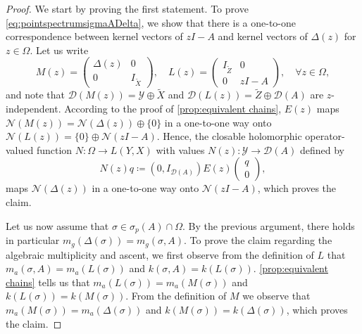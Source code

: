 \documentclass[english]{myarticle}
\begin{document}
\begin{sloppypar}
\begin{proof}
We start by proving the first statement. To prove \eqref{eq:pointspectrumsigmaADelta}, we show that there is a one-to-one correspondence between kernel vectors of $z I-A$ and kernel vectors of $\Delta(z)$ for $ z \in \Omega$. Let us write
\begin{equation*}
    M(z) = \begin{pmatrix}
            \Delta(z) & 0 \\
            0 & I_{\tilde{X}}
        \end{pmatrix}, \quad
    L(z) = \begin{pmatrix}
            I_{\tilde{Z}}& 0 \\
            0 & zI - A
        \end{pmatrix}, \quad \forall z \in \Omega,
\end{equation*}
and note that $\mathcal{D}(M(z)) = \mathcal{Y} \oplus \tilde{X}$ and $\mathcal{D}(L(z)) = \tilde{Z} \oplus \mathcal{D}(A)$ are $z$-independent. According to the proof of \cref{prop:equivalent chains}, $E(z)$ maps $\mathcal{N}(M(z)) = \mathcal{N}(\Delta(z)) \oplus \{0\}$ in a one-to-one way onto $\mathcal{N}(L(z)) = \{0\} \oplus \mathcal{N}(z I-A)$. Hence, the closable holomorphic operator-valued function $N : \Omega \to L(Y,X)$ with values $N(z) : \mathcal{Y} \to \mathcal{D}(A)$ defined by
\begin{equation*}
    N(z) q \coloneqq (0,I_{\mathcal{D}(A)}) E(z) 
    \begin{pmatrix}
        q \\
        0
    \end{pmatrix},
\end{equation*}
maps $\mathcal{N} (\Delta(z))$ in a one-to-one way onto $\mathcal{N}(z I-A)$, which proves the claim. 

Let us now assume that $\sigma \in \sigma_p(A) \cap \Omega$. By the previous argument, there holds in particular $m_g(\Delta(\sigma)) = m_g(\sigma,A)$. To prove the claim regarding the algebraic multiplicity and ascent, we first observe from the definition of $L$ that $m_a(\sigma,A) = m_a(L(\sigma))$ and $k(\sigma,A) = k(L(\sigma))$. \cref{prop:equivalent chains} tells us that $m_a(L(\sigma)) = m_a(M(\sigma))$ and $k(L(\sigma)) = k(M(\sigma))$. From the definition of $M$ we observe that $m_a(M(\sigma)) = m_a(\Delta(\sigma))$ and $k(M(\sigma)) = k(\Delta(\sigma))$, which proves the claim.


\end{proof}
\end{sloppypar}
\end{document}
